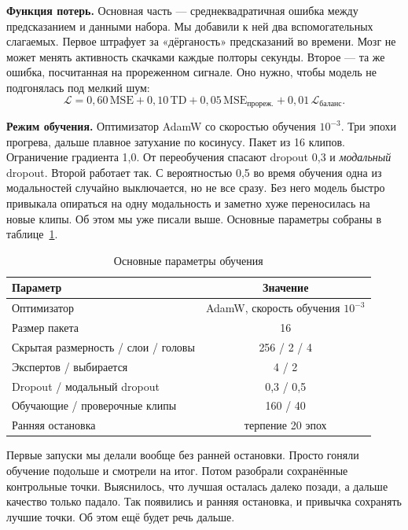 \documentclass[12pt,a4paper]{article}
\begin{document}
\textbf{Функция потерь.} Основная часть — среднеквадратичная ошибка
между предсказанием и данными набора. Мы добавили к ней два
вспомогательных слагаемых. Первое штрафует за «дёрганость»
предсказаний во времени. Мозг не может менять активность скачками
каждые полторы секунды. Второе — та же ошибка, посчитанная на
прореженном сигнале. Оно нужно, чтобы модель не подгонялась под мелкий
шум:
\begin{equation}
\mathcal{L} = 0{,}60\,\mathrm{MSE}
+ 0{,}10\,\mathrm{TD}
+ 0{,}05\,\mathrm{MSE}_{\text{прореж.}}
+ 0{,}01\,\mathcal{L}_{\text{баланс}} .
\label{eq:loss}
\end{equation}

\textbf{Режим обучения.} Оптимизатор AdamW со скоростью обучения
$10^{-3}$. Три эпохи прогрева, дальше плавное затухание по косинусу.
Пакет из 16 клипов. Ограничение градиента 1{,}0. От переобучения
спасают dropout 0{,}3 и \emph{модальный} dropout. Второй работает так.
С вероятностью 0{,}5 во время обучения одна из модальностей случайно
выключается, но не все сразу. Без него модель быстро привыкала
опираться на одну модальность и заметно хуже переносилась на новые
клипы. Об этом мы уже писали выше. Основные параметры собраны в
таблице~\ref{tab:hyper}.

\begin{table}[H]
\centering
\caption{Основные параметры обучения}
\label{tab:hyper}
\small
\begin{tabular}{lc}
\toprule
Параметр & Значение \\
\midrule
Оптимизатор & AdamW, скорость обучения $10^{-3}$ \\
Размер пакета & 16 \\
Скрытая размерность / слои / головы & 256 / 2 / 4 \\
Экспертов / выбирается & 4 / 2 \\
Dropout / модальный dropout & 0{,}3 / 0{,}5 \\
Обучающие / проверочные клипы & 160 / 40 \\
Ранняя остановка & терпение 20 эпох \\
\bottomrule
\end{tabular}
\end{table}

Первые запуски мы делали вообще без ранней остановки. Просто гоняли
обучение подольше и смотрели на итог. Потом разобрали сохранённые
контрольные точки. Выяснилось, что лучшая осталась далеко позади, а
дальше качество только падало. Так появились и ранняя остановка, и
привычка сохранять лучшие точки. Об этом ещё будет речь дальше.
\end{document}
